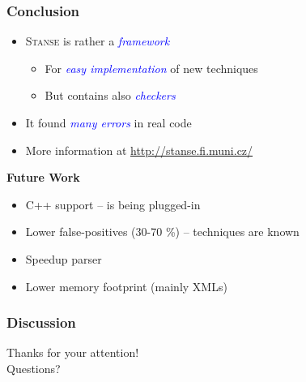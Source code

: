 \documentclass[xcolor=dvipsnames]{beamer}
\let\Oldemph\emph
\renewcommand{\emph}[1]{\textcolor{blue}{\Oldemph{#1}}}
\newcommand{\heading}[1]{\textbf{\textcolor{BurntOrange}{#1}}}
\begin{document}
\begin{frame}
  \frametitle{Conclusion}
  \begin{itemize}
  \item \textsc{Stanse} is rather a \emph{framework}
  \begin{itemize}
  \item For \emph{easy implementation} of new techniques
  \item But contains also \emph{checkers}
  \end{itemize}
  \item It found \emph{many errors} in real code
  \item More information at \url{http://stanse.fi.muni.cz/}
  \end{itemize}

  \pause
  \medskip

  \heading{Future Work}
  \begin{itemize}
  \item C++ support -- is being plugged-in
  \item Lower false-positives (30-70 \%) -- techniques are known
  \item Speedup parser
  \item Lower memory footprint (mainly XMLs)
  \end{itemize}

\end{frame}

\begin{frame}
  \frametitle{Discussion}
  \begin{center} \huge
  Thanks for your attention! \\[2em]
  Questions?
  \end{center}
\end{frame}
\end{document}
